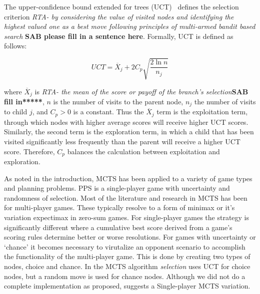 \documentclass[letterpaper]{article}
\begin{document}


The upper-confidence bound extended for trees (UCT)~\cite{kocsis2006improved} defines the selection criterion \textit{RTA- by considering the value of visited nodes and identifying the highest valued one as a best move following principles of multi-armed bandit based search} {\bf SAB please fill in a sentence here}. Formally, UCT is defined as follows:

\begin{equation} \label{eq:UCT}
UCT = \overline{X}_j + 2C_p\sqrt{\frac{2\ln{n}}{n_j}}
\end{equation}

\noindent where $\overline{X}_j$ is \textit{RTA- the mean of the score or payoff of the branch's selection}{\bf SAB fill in*****}, $n$ is the number of visits to the parent node, $n_j$ the number of visits to child $j$, and $C_p > 0$ is a constant. Thus the $\overline{X}_j$ term is the exploitation term, through which nodes with higher average scores will receive higher UCT scores. Similarly, the second term is the exploration term, in which a child that has been visited significantly less frequently than the parent will receive a higher UCT score. Therefore, $C_p$ balances the calculation between exploitation and exploration.

As noted in the introduction, MCTS has been applied to a variety of game types and planning problems. PPS is a single-player game with uncertainty and randomness of selection. Most of the literature and research in MCTS has been for multi-player games. These typically resolve to a form of minimax or it's variation expectimax in zero-sum games. For single-player games the strategy is significantly different where a cumulative best score derived from a game's scoring rules determine better or worse resolutions. For games with uncertainty or `chance' it becomes necessary to virutalize an opponent scenario to accomplish the functionality of the multi-player game. This is done by creating two types of nodes, choice and chance. In the MCTS algorithm \emph{selection} uses UCT for choice nodes, but a random move is used for chance nodes. Although we did not do a complete implementation as proposed, \cite{schadd2012single} suggests a Single-player MCTS variation.
\end{document}

